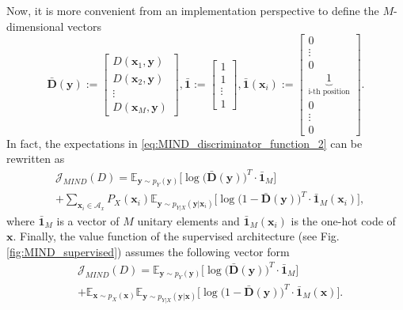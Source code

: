 Now, it is more convenient from an implementation perspective to define the $M$-dimensional vectors
\begin{equation}
\bar{\mathbf{D}}(\mathbf{y}) := 
\begin{bmatrix}
   D(\mathbf{x}_1,\mathbf{y})  \\
   D(\mathbf{x}_2,\mathbf{y}) \\
   \vdots \\
    D(\mathbf{x}_M,\mathbf{y})
\end{bmatrix}
, 
\bar{\mathbf{1}} := 
\begin{bmatrix}
   1  \\
   1 \\
   \vdots \\
    1
\end{bmatrix}
, 
\bar{\mathbf{1}}({\mathbf{x}_i}) := 
\begin{bmatrix}
   0  \\
   \vdots \\
    0 \\
    \underbrace{1}_\text{i-th position} \\ 
    0 \\
    \vdots \\
    0
\end{bmatrix}.
\end{equation}
In fact, the expectations in \eqref{eq:MIND_discriminator_function_2} can be rewritten as
\begin{align}
\label{eq:MIND_disc_vect_1}
    &\mathcal{J}_{MIND}(D) =   \mathbb{E}_{\mathbf{y} \sim p_{Y}(\mathbf{y})}\biggl[\log \bigl(\bar{\mathbf{D}}(\mathbf{y}) \bigr)^T\cdot \bar{\mathbf{1}}_M\biggr] \\ \nonumber 
    &+\sum_{\mathbf{x}_i\in \mathcal{A}_x}{P_X(\mathbf{x}_i) \mathbb{E}_{\mathbf{y} \sim p_{Y|X}(\mathbf{y}|\mathbf{x}_i)}\biggl[\log \bigl(1-\bar{\mathbf{D}}(\mathbf{y})\bigr)^T\cdot \bar{\mathbf{1}}_M({\mathbf{x}_i})\biggr]},
\end{align}
where $\bar{\mathbf{1}}_M$ is a vector of $M$ unitary elements and $\bar{\mathbf{1}}_M({\mathbf{x}_i})$ is the one-hot code of $\mathbf{x}$.
Finally, the value function of the supervised architecture (see Fig. \ref{fig:MIND_supervised}) assumes the following vector form 
\begin{align}
\label{eq:MIND_new_discriminator_function}
 &\mathcal{J}_{MIND}(D) =   \mathbb{E}_{\mathbf{y} \sim p_{Y}(\mathbf{y})}\biggl[\log \bigl(\bar{\mathbf{D}}(\mathbf{y}) \bigr)^T\cdot \bar{\mathbf{1}}_M\biggr] \\ \nonumber
 &+\mathbb{E}_{\mathbf{x} \sim p_{X}(\mathbf{x})} \mathbb{E}_{\mathbf{y} \sim p_{Y|X}(\mathbf{y}|\mathbf{x})}\biggl[\log \bigl(1-\bar{\mathbf{D}}(\mathbf{y})\bigr)^T\cdot \bar{\mathbf{1}}_M(\mathbf{x})\biggr].
\end{align}

